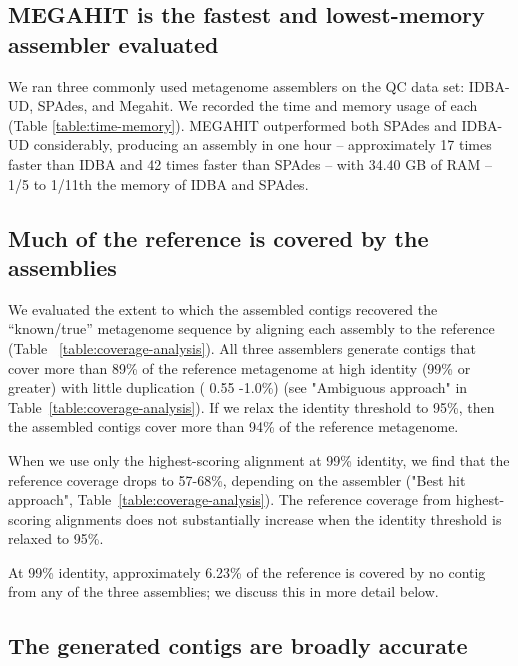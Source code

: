 \documentclass[10pt,a4paper,twocolumn]{article}
\begin{document}
\subsection*{MEGAHIT is the fastest and lowest-memory assembler evaluated}

We ran three commonly used metagenome assemblers on the QC data set: IDBA-UD, SPAdes, and Megahit. We
recorded the time and memory usage of each (Table
\ref{table:time-memory}).  MEGAHIT outperformed both SPAdes and IDBA-UD considerably, producing an assembly in one hour -- approximately 17 times faster than IDBA and 42 times faster than SPAdes -- with 34.40 GB of RAM -- 1/5 to 1/11th the memory of IDBA and SPAdes.
\subsection*{Much of the reference is covered by the assemblies}

We evaluated the extent to which the assembled contigs recovered the ``known/true'' metagenome sequence by aligning each assembly to the reference (Table ~\ref{table:coverage-analysis}).
All three assemblers generate contigs that cover more than 89\% of the reference metagenome at high identity (99\% or greater) with little duplication ( 0.55 -1.0\%) (see "Ambiguous approach" in Table~\ref{table:coverage-analysis}).  If we relax the identity threshold to 95\%, then the assembled contigs cover more than 94\% of the reference metagenome.

When we use only the highest-scoring alignment at 99\% identity, we find that the reference coverage drops to 57-68\%, depending on the assembler ("Best hit approach", Table~\ref{table:coverage-analysis}). The reference coverage from highest-scoring alignments does not substantially increase when the identity threshold is relaxed to 95\%.

At 99\% identity, approximately 6.23\% of the reference is covered by no contig from any of the three assemblies; we discuss this in more detail below. %

\subsection*{The generated contigs are broadly accurate} 
\end{document}
